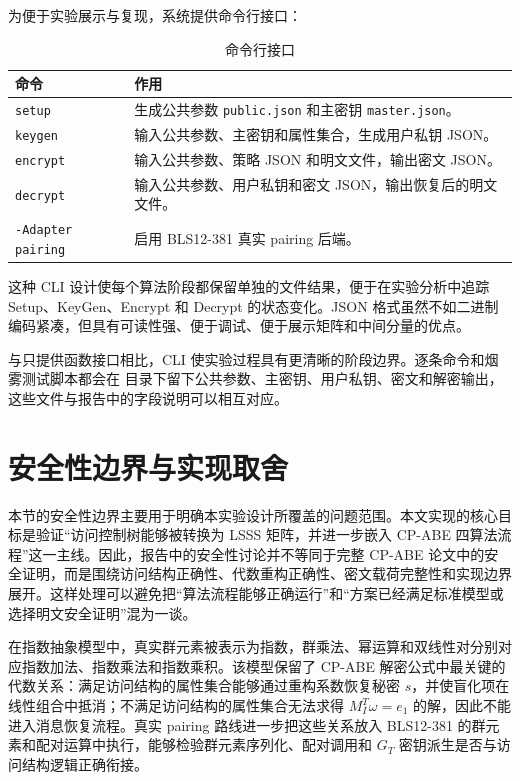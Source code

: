 为便于实验展示与复现，系统提供命令行接口：

\begin{table}[H]
\centering
\caption{命令行接口}
\begin{tabular}{p{} p{}}
\toprule
命令 & 作用 \\
\midrule
\verb|setup| & 生成公共参数 \verb|public.json| 和主密钥 \verb|master.json|。\\
\verb|keygen| & 输入公共参数、主密钥和属性集合，生成用户私钥 JSON。\\
\verb|encrypt| & 输入公共参数、策略 JSON 和明文文件，输出密文 JSON。\\
\verb|decrypt| & 输入公共参数、用户私钥和密文 JSON，输出恢复后的明文文件。\\
\verb|-Adapter| \verb|pairing| & 启用 BLS12-381 真实 pairing 后端。\\
\bottomrule
\end{tabular}
\end{table}

这种 CLI 设计使每个算法阶段都保留单独的文件结果，便于在实验分析中追踪 Setup、KeyGen、Encrypt 和 Decrypt 的状态变化。JSON 格式虽然不如二进制编码紧凑，但具有可读性强、便于调试、便于展示矩阵和中间分量的优点。

与只提供函数接口相比，CLI 使实验过程具有更清晰的阶段边界。逐条命令和烟雾测试脚本都会在  目录下留下公共参数、主密钥、用户私钥、密文和解密输出，这些文件与报告中的字段说明可以相互对应。

\section{安全性边界与实现取舍}

本节的安全性边界主要用于明确本实验设计所覆盖的问题范围。本文实现的核心目标是验证“访问控制树能够被转换为 LSSS 矩阵，并进一步嵌入 CP-ABE 四算法流程”这一主线。因此，报告中的安全性讨论并不等同于完整 CP-ABE 论文中的安全证明，而是围绕访问结构正确性、代数重构正确性、密文载荷完整性和实现边界展开。这样处理可以避免把“算法流程能够正确运行”和“方案已经满足标准模型或选择明文安全证明”混为一谈。

在指数抽象模型中，真实群元素被表示为指数，群乘法、幂运算和双线性对分别对应指数加法、指数乘法和指数乘积。该模型保留了 CP-ABE 解密公式中最关键的代数关系：满足访问结构的属性集合能够通过重构系数恢复秘密 $s$，并使盲化项在线性组合中抵消；不满足访问结构的属性集合无法求得 $M_I^T\omega=e_1$ 的解，因此不能进入消息恢复流程。真实 pairing 路线进一步把这些关系放入 BLS12-381 的群元素和配对运算中执行，能够检验群元素序列化、配对调用和 $G_T$ 密钥派生是否与访问结构逻辑正确衔接。

